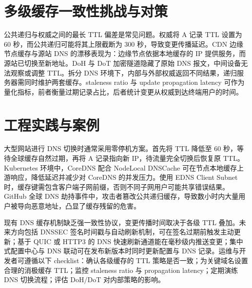 \chapter{多级缓存一致性挑战与对策}
公共递归与权威之间的最长 TTL 偏差是常见问题。权威将 A 记录 TTL 设置为 60 秒，而公共递归可能将其上限截断为 300 秒，导致变更传播延迟。CDN 边缘节点缓存与源站 DNS 的漂移表现为：边缘节点依据本地缓存的 IP 提供服务，而源站已切换至新地址。DoH 与 DoT 加密隧道隐藏了原始 DNS 报文，中间设备无法观察或调整 TTL。拆分 DNS 环境下，内部与外部权威返回不同结果，递归服务器需同时维护两套缓存。staleness ratio 与 update propagation latency 可作为量化指标，前者衡量过期记录占比，后者统计变更从权威到达终端用户的时间。\par
\chapter{工程实践与案例}
大型网站进行 DNS 切换时通常采用零停机方案。首先将 TTL 降低至 60 秒，等待全球缓存自然过期，再将 A 记录指向新 IP，待流量完全切换后恢复原 TTL。Kubernetes 环境中，CoreDNS 配合 NodeLocal DNSCache 可在节点本地缓存上游响应，降低延迟并减少对 CoreDNS 的并发压力。使用 EDNS Client Subnet 时，缓存键需包含客户端子网前缀，否则不同子网用户可能共享错误结果。GitHub 全球 DNS 劫持事件中，攻击者篡改公共递归缓存，导致数小时内大量用户被导向恶意地址，凸显了缓存残留的危害。\par
现有 DNS 缓存机制缺乏强一致性协议，变更传播时间取决于各级 TTL 叠加。未来方向包括 DNSSEC 签名时间戳与自动刷新机制，可在签名过期前触发主动更新；基于 QUIC 或 HTTP3 的 DNS 快速刷新通道能在毫秒级内推送变更；集中式配置中心与 DNS 联动可在发布新版本时同时更新配置与 DNS 记录。运维与开发者可遵循以下 checklist：确认各级缓存的 TTL 策略是否一致；为关键域名设置合理的消极缓存 TTL；监控 staleness ratio 与 propagation latency；定期演练 DNS 切换流程；评估 DoH/DoT 对内部策略的影响。\par
